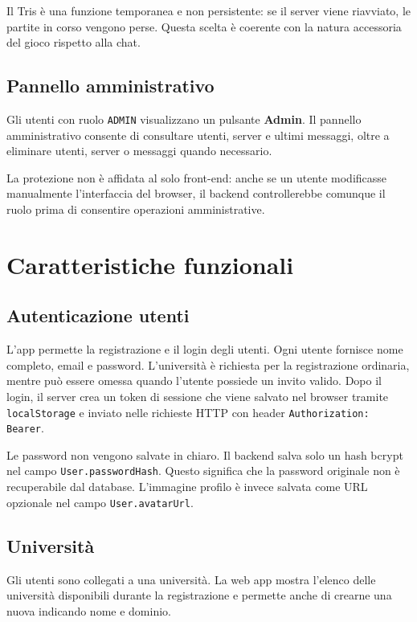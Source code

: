 \documentclass[11pt,a4paper]{article}
\begin{document}
Il Tris è una funzione temporanea e non persistente: se il server viene riavviato, le partite in corso vengono perse. Questa scelta è coerente con la natura accessoria del gioco rispetto alla chat.

\subsection{Pannello amministrativo}

Gli utenti con ruolo \texttt{ADMIN} visualizzano un pulsante \textbf{Admin}. Il pannello amministrativo consente di consultare utenti, server e ultimi messaggi, oltre a eliminare utenti, server o messaggi quando necessario.

La protezione non è affidata al solo front-end: anche se un utente modificasse manualmente l'interfaccia del browser, il backend controllerebbe comunque il ruolo prima di consentire operazioni amministrative.

\section{Caratteristiche funzionali}

\subsection{Autenticazione utenti}

L'app permette la registrazione e il login degli utenti. Ogni utente fornisce nome completo, email e password. L'università è richiesta per la registrazione ordinaria, mentre può essere omessa quando l'utente possiede un invito valido. Dopo il login, il server crea un token di sessione che viene salvato nel browser tramite \texttt{localStorage} e inviato nelle richieste HTTP con header \texttt{Authorization: Bearer}.

Le password non vengono salvate in chiaro. Il backend salva solo un hash bcrypt nel campo \texttt{User.passwordHash}. Questo significa che la password originale non è recuperabile dal database. L'immagine profilo è invece salvata come URL opzionale nel campo \texttt{User.avatarUrl}.

\subsection{Università}

Gli utenti sono collegati a una università. La web app mostra l'elenco delle università disponibili durante la registrazione e permette anche di crearne una nuova indicando nome e dominio.
\end{document}
